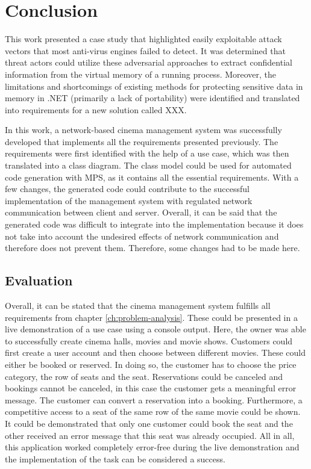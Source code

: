 \chapter{Conclusion}
\label{ch:conclusion}

This work presented a case study that highlighted easily exploitable attack vectors that most anti-virus engines failed to detect. It was determined that threat actors could utilize these adversarial approaches to extract confidential information from the virtual memory of a running process. Moreover, the limitations and shortcomings of existing methods for protecting sensitive data in memory in .NET (primarily a lack of portability) were identified and translated into requirements for a new solution called XXX. 

In this work, a network-based cinema management system was successfully developed that implements all the requirements presented previously. The requirements were first identified with the help of a use case, which was then translated into a class diagram. The class model could be used for automated code generation with MPS, as it contains all the essential requirements. With a few changes, the generated code could contribute to the successful implementation of the management system with regulated network communication between client and server. 
Overall, it can be said that the generated code was difficult to integrate into the implementation because it does not take into account the undesired effects of network communication and therefore does not prevent them. Therefore, some changes had to be made here.

\section{Evaluation}
Overall, it can be stated that the cinema management system fulfills all requirements from chapter \ref{ch:problem-analysis}. These could be presented in a live demonstration of a use case using a console output. Here, the owner was able to successfully create cinema halls, movies and movie shows. Customers could first create a user account and then choose between different movies. These could either be booked or reserved. In doing so, the customer has to choose the price category, the row of seats and the seat. Reservations could be canceled and bookings cannot be canceled, in this case the customer gets a meaningful error message. The customer can convert a reservation into a booking. Furthermore, a competitive access to a seat of the same row of the same movie could be shown. It could be demonstrated that only one customer could book the seat and the other received an error message that this seat was already occupied. All in all, this application worked completely error-free during the live demonstration and the implementation of the task can be considered a success.


